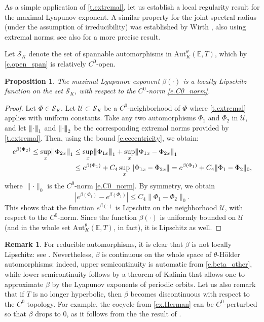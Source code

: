 \documentclass[JEP,XML,SOM,Unicode]{cedram}
\let\mathcal\mathscr
\theoremstyle{plain}
\newtheorem{proposition}[theorem]{Proposition}
\theoremstyle{definition}
\newtheorem{remark}[theorem]{Remark}
\newcommand{\tribar}[1]{\mathopen{| {\kern -1.5pt} | {\kern -1.5pt} |} {#1}
\mathclose{| {\kern -1.5pt} | {\kern -1.5pt} |}}
\newcommand{\EE}{\mathbb{E}}
\newcommand{\cS}{\mathcal{S}}
\newcommand{\cU}{\mathcal{U}}
\newcommand{\Aut}{\mathrm{Aut}}
\begin{document}
\label{ss.Wirth}

As a simple application of \cref{t.extremal}, let us establish a local regularity result for the maximal Lyapunov exponent. A similar property for the joint spectral radius (under the assumption of irreducibility) was established by Wirth \cite[Cor.\,4.2]{Wirth}, also using extremal norms; see also \cite{Kozyakin} for a more precise result.

Let $\cS_K$ denote the set of spannable automorphisms in $\Aut^\theta_K(\EE,T)$, which by \cref{c.open_span} is relatively $C^0$-open.

\begin{proposition}\label{p.Wirth}
The maximal Lyapunov exponent $\beta(\mathord{\cdot})$ is a locally Lipschitz function on the set $\cS_K$, with respect to the $C^0$-norm \eqref{e.C0_norm}.
\end{proposition}

\begin{proof}
Let $\Phi \in \cS_K$.
Let $\cU \subset \cS_K$ be a $C^0$-neighborhood of $\Phi$ where \cref{t.extremal} applies with uniform constants.
Take any two automorphisms $\Phi_1$ and $\Phi_2$ in $\cU$, and let $\tribar{\mathord{\cdot}}_1$ and $\tribar{\mathord{\cdot}}_2$ be the corresponding extremal norms provided by \cref{t.extremal}.
Then, using the bound \eqref{e.eccentricity}, we obtain:
\begin{align*}
e^{\beta(\Phi_2)}	\le \sup_x \tribar{\Phi_{2x}}_1
					&\le \sup_x \tribar{\Phi_{1x}}_1 + \sup_x \tribar{\Phi_{1x} - \Phi_{2x}}_1 \\
					&\le e^{\beta(\Phi_1)} + C_4 \sup_x \| \Phi_{1x} - \Phi_{2x} \|
					= e^{\beta(\Phi_1)} + C_4 \|\Phi_1 - \Phi_2\|_0,
\end{align*}
where $\| \mathord{\cdot} \|_0$ is the $C^0$-norm \eqref{e.C0_norm}.
By symmetry, we obtain
\[
|e^{\beta(\Phi_1)} - e^{\beta(\Phi_1)}| \le C_4 \|\Phi_1 - \Phi_2\|_0.
\]
This shows that the function $e^{\beta(\mathord{\cdot})}$ is Lipschitz on the neighborhood $\cU$, with respect to the $C^0$-norm.
Since the function $\beta(\mathord{\cdot})$ is uniformly bounded on $\cU$ (and in the whole set $\Aut^\theta_K(\EE,T)$, in fact), it is Lipschitz as well.
\end{proof}

\begin{remark}\label{r.regularity_beta}
For reducible automorphisms, it is clear that $\beta$ is not locally Lipschitz: see \eg \cite[p.\,27]{Wirth}.
Nevertheless, $\beta$ is continuous on the whole space of $\theta$-Hölder automorphisms: indeed, upper semicontinuity is automatic from \eqref{e.beta_other}, while lower semicontinuity follows by a theorem of Kalinin \cite[Th.\,1.4]{Kalinin} that allows one to approximate $\beta$ by the Lyapunov exponents of periodic orbits. Let us also remark that if $T$ is no longer hyperbolic, then $\beta$ becomes discontinuous with respect to the $C^0$ topology.
For example, the cocycle from \cref{ex.Herman} can be $C^0$-perturbed so that $\beta$ drops to $0$, as it follows \eg from the the result of \cite{AB}.
\end{remark}
\end{document}
